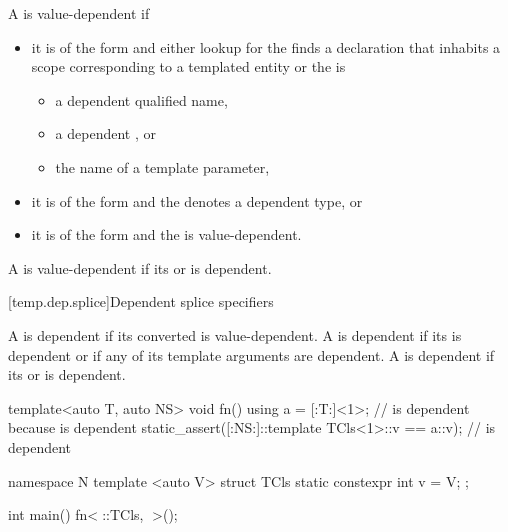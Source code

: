 \pnum
A  is value-dependent if
\begin{itemize}
\item
it is of the form  and
either lookup for the  finds a declaration that
inhabits a scope corresponding to a templated entity or
the  is
\begin{itemize}
\item a dependent qualified name,
\item a dependent , or
\item the name of a template parameter,
\end{itemize}
\item
it is of the form  and
the  denotes a dependent type, or
\item
it is of the form  and
the  is value-dependent.
\end{itemize}

\pnum
A  is value-dependent
if its  or
is dependent.

[temp.dep.splice]{Dependent splice specifiers}

\pnum
A  is dependent
if its converted  is value-dependent.
A  is dependent
if its  is dependent or
if any of its template arguments are dependent.
A  is dependent
if its  or
 is dependent.

\pnum
\begin{example}
\begin{codeblock}
template<auto T, auto NS>
void fn() {
  using a = [:T:]<1>;                           //  is dependent because \tcode{[:T:]} is dependent
  static_assert([:NS:]::template TCls<1>::v == a::v);   // \tcode{[:NS:]} is dependent
}

namespace N {
  template <auto V> struct TCls { static constexpr int v = V; };
}

int main() {
  fn<^^N::TCls, ^^N>();
}
\end{codeblock}
\end{example}


